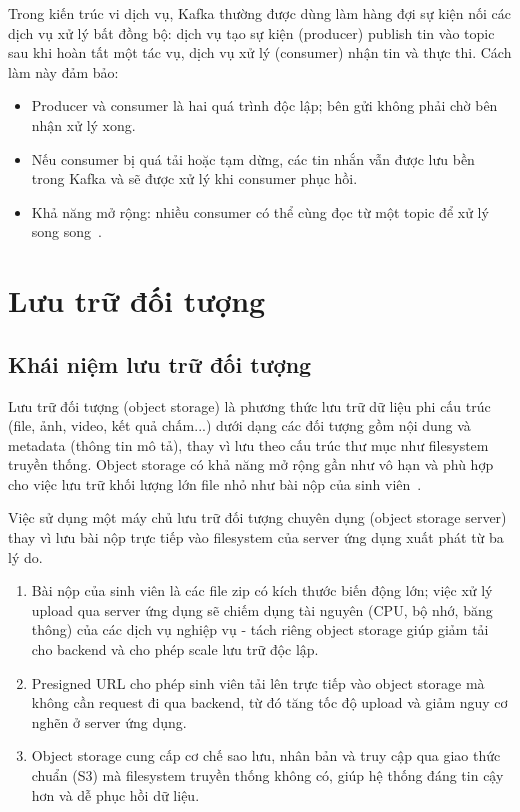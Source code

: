 \documentclass[../BTL.tex]{subfiles}
\begin{document}
Trong kiến trúc vi dịch vụ, Kafka thường được dùng làm hàng đợi sự kiện nối các dịch vụ xử lý bất đồng bộ: dịch vụ tạo sự kiện (producer) publish tin vào topic sau khi hoàn tất một tác vụ, dịch vụ xử lý (consumer) nhận tin và thực thi. Cách làm này đảm bảo:
\begin{itemize}
    \item Producer và consumer là hai quá trình độc lập; bên gửi không phải chờ bên nhận xử lý xong.
    \item Nếu consumer bị quá tải hoặc tạm dừng, các tin nhắn vẫn được lưu bền trong Kafka và sẽ được xử lý khi consumer phục hồi.
    \item Khả năng mở rộng: nhiều consumer có thể cùng đọc từ một topic để xử lý song song~\cite{kreps2011kafka,kafkadocs}.
\end{itemize}

\section{Lưu trữ đối tượng}
\label{section:1.6}

\subsection{Khái niệm lưu trữ đối tượng}
\label{section:1.6.1}

Lưu trữ đối tượng (object storage) là phương thức lưu trữ dữ liệu phi cấu trúc (file, ảnh, video, kết quả chấm...) dưới dạng các đối tượng gồm nội dung và metadata (thông tin mô tả), thay vì lưu theo cấu trúc thư mục như filesystem truyền thống. Object storage có khả năng mở rộng gần như vô hạn và phù hợp cho việc lưu trữ khối lượng lớn file nhỏ như bài nộp của sinh viên~\cite{awss3docs}.

Việc sử dụng một máy chủ lưu trữ đối tượng chuyên dụng (object storage server) thay vì lưu bài nộp trực tiếp vào filesystem của server ứng dụng xuất phát từ ba lý do.
\begin{enumerate}
    \item Bài nộp của sinh viên là các file zip có kích thước biến động lớn; việc xử lý upload qua server ứng dụng sẽ chiếm dụng tài nguyên (CPU, bộ nhớ, băng thông) của các dịch vụ nghiệp vụ - tách riêng object storage giúp giảm tải cho backend và cho phép scale lưu trữ độc lập.
    \item Presigned URL cho phép sinh viên tải lên trực tiếp vào object storage mà không cần request đi qua backend, từ đó tăng tốc độ upload và giảm nguy cơ nghẽn ở server ứng dụng.
    \item Object storage cung cấp cơ chế sao lưu, nhân bản và truy cập qua giao thức chuẩn (S3) mà filesystem truyền thống không có, giúp hệ thống đáng tin cậy hơn và dễ phục hồi dữ liệu.
\end{enumerate}
\end{document}
